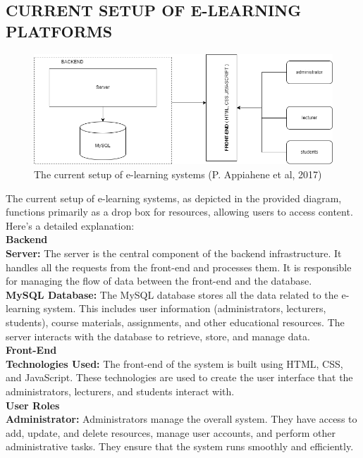 \documentclass[a4paper,12pt]{article}  %
\begin{document}
\subsection{CURRENT SETUP OF E-LEARNING PLATFORMS}
\begin{figure}[H]
  \centering
  \includegraphics[width=1\textwidth]{figures/current.png}
  \caption{The current setup of e-learning systems (P. Appiahene et al, 2017)\cite{appiahene2017design}}
\end{figure}
The current setup of e-learning systems, as depicted in the provided diagram,
functions primarily as a drop box for resources, allowing users to access
content. Here's a detailed explanation:\\
\large\textbf{Backend}\\
\textbf{Server:} The server is the central component of the backend infrastructure. It
handles all the requests from the front-end and processes them. It is
responsible for managing the flow of data between the front-end and the
database.\\

\textbf{MySQL Database:} The MySQL database stores all the data related to the
e-learning system. This includes user information (administrators, lecturers,
students), course materials, assignments, and other educational resources. The
server interacts with the database to retrieve, store, and manage data.\\

\large\textbf{Front-End}\\
\textbf{Technologies Used:} The front-end of the system is built using HTML, CSS, and
JavaScript. These technologies are used to create the user interface that the
administrators, lecturers, and students interact with.\\

\large\textbf{User Roles}\\
\textbf{Administrator:} Administrators manage the overall system. They have access to
add, update, and delete resources, manage user accounts, and perform other
administrative tasks. They ensure that the system runs smoothly and
efficiently.\\
\end{document}
